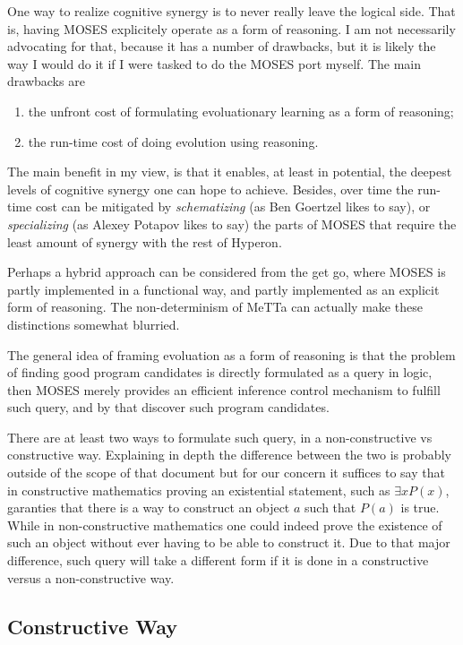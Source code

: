 \documentclass[]{report}
\begin{document}
One way to realize cognitive synergy is to never really leave the
logical side.  That is, having MOSES explicitely operate as a form of
reasoning.  I am not necessarily advocating for that, because it has a
number of drawbacks, but it is likely the way I would do it if I were
tasked to do the MOSES port myself.  The main drawbacks are
\begin{enumerate}
\item the unfront cost of formulating evoluationary learning as a form of
reasoning;
\item the run-time cost of doing evolution using reasoning.
\end{enumerate}
The main benefit in my view, is that it enables, at least in
potential, the deepest levels of cognitive synergy one can hope to
achieve.  Besides, over time the run-time cost can be mitigated by
\emph{schematizing} (as Ben Goertzel likes to say), or \emph{specializing} (as
Alexey Potapov likes to say) the parts of MOSES that require the least
amount of synergy with the rest of Hyperon.

Perhaps a hybrid approach can be considered from the get go, where
MOSES is partly implemented in a functional way, and partly
implemented as an explicit form of reasoning.  The non-determinism of
MeTTa can actually make these distinctions somewhat blurried.

The general idea of framing evoluation as a form of reasoning is that
the problem of finding good program candidates is directly formulated
as a query in logic, then MOSES merely provides an efficient inference
control mechanism to fulfill such query, and by that discover such
program candidates.

There are at least two ways to formulate such query, in a
non-constructive vs constructive way.  Explaining in depth the
difference between the two is probably outside of the scope of that
document but for our concern it suffices to say that in constructive
mathematics proving an existential statement, such as $\exists x
P(x)$, garanties that there is a way to construct an object $a$ such
that $P(a)$ is true.  While in non-constructive mathematics one could
indeed prove the existence of such an object without ever having to be
able to construct it.  Due to that major difference, such query will
take a different form if it is done in a constructive versus a
non-constructive way.

\subsection{Constructive Way}
\end{document}
